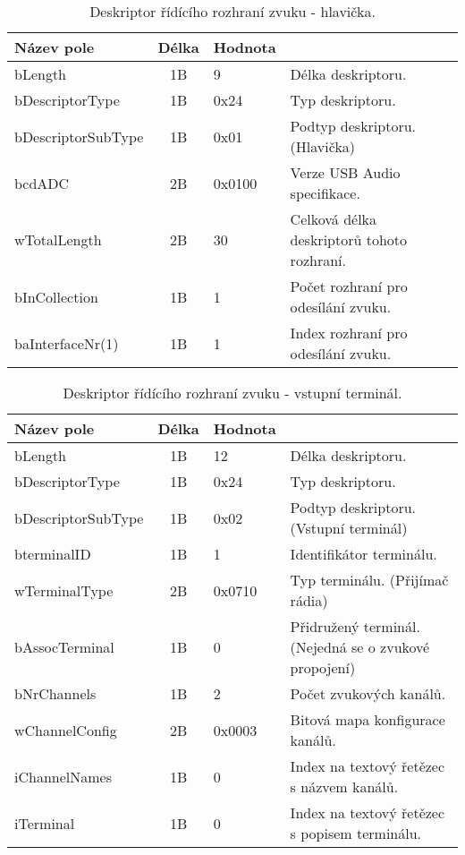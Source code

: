 \begin{table}[t]
\begin{center}
\begin{tabular}{|l|c|l|l|}
\hline 
Název pole & Délka & Hodnota &  \\ 
\hline
bLength & 1B & 9 & Délka deskriptoru.\\
\hline
bDescriptorType & 1B & 0x24 & Typ deskriptoru. \\
\hline
bDescriptorSubType & 1B & 0x01 & Podtyp deskriptoru. (Hlavička)\\
\hline
bcdADC & 2B & 0x0100 & Verze USB Audio specifikace.\\
\hline
wTotalLength & 2B & 30 & Celková délka deskriptorů tohoto rozhraní.\\
\hline
bInCollection & 1B & 1 & Počet rozhraní pro odesílání zvuku.\\
\hline
baInterfaceNr(1) & 1B & 1 & Index rozhraní pro odesílání zvuku.\\
\hline
\end{tabular}  
\end{center}
\caption{Deskriptor řídícího rozhraní zvuku - hlavička.}
\label{tab:usb-aud-ctrl-head} 
\end{table}

\clearpage

\begin{table}[t]
\begin{center}
\begin{tabular}{|l|c|l|l|}
\hline 
Název pole & Délka & Hodnota &  \\ 
\hline
bLength & 1B & 12 & Délka deskriptoru.\\
\hline
bDescriptorType & 1B & 0x24 & Typ deskriptoru. \\
\hline
bDescriptorSubType & 1B & 0x02 & Podtyp deskriptoru. (Vstupní terminál)\\
\hline
bterminalID & 1B & 1 & Identifikátor terminálu.\\
\hline
wTerminalType & 2B & 0x0710 & Typ terminálu. (Přijímač rádia)\\
\hline
bAssocTerminal & 1B & 0 & Přidružený terminál. (Nejedná se o zvukové propojení)\\
\hline
bNrChannels & 1B & 2 & Počet zvukových kanálů.\\
\hline
wChannelConfig & 2B & 0x0003 & Bitová mapa konfigurace kanálů.\\
\hline
iChannelNames & 1B & 0 & Index na textový řetězec s názvem kanálů.\\
\hline
iTerminal & 1B & 0 & Index na textový řetězec s popisem terminálu.\\
\hline
\end{tabular}  
\end{center}
\caption{Deskriptor řídícího rozhraní zvuku - vstupní terminál.}
\label{tab:usb-aud-ctrl-in} 
\end{table}

